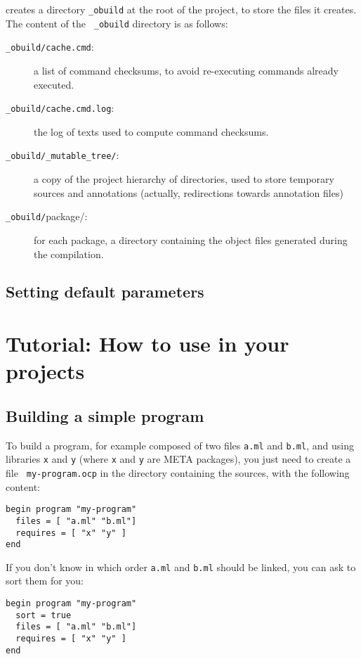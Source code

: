 \ocpbuild{} creates a directory {\tt \_obuild} at the root of the
project, to store the files it creates. The content of the {\tt
  \_obuild} directory is as follows:
\begin{description}
\item[{\tt \_obuild/cache.cmd}:] a list of command checksums, to avoid
  re-executing commands already executed.
\item[{\tt \_obuild/cache.cmd.log}:] the log of texts used to compute
  command checksums.
\item[{\tt \_obuild/\_mutable\_tree/}:] a copy of the project hierarchy
  of directories, used to store temporary sources and annotations
  (actually, redirections towards annotation files)
\item[{\tt \_obuild/}package/:] for each package, a directory
  containing the object files generated during the compilation.
\end{description}


\section{Setting \ocpbuild{} default parameters}

\chapter{Tutorial: How to use \ocpbuild{} in your projects}

\section{Building a simple program}

To build a program, for example composed of two files {\tt a.ml} and
{\tt b.ml}, and using libraries {\tt x} and {\tt y} (where {\tt x} and
{\tt y} are META packages), you just need to create a file {\tt
  my-program.ocp} in the directory containing the sources, with the
following content:

\begin{verbatim}
begin program "my-program"
  files = [ "a.ml" "b.ml"]
  requires = [ "x" "y" ]
end
\end{verbatim}

If you don't know in which order {\tt a.ml} and {\tt b.ml} should be
linked, you can ask \ocpbuild{} to sort them for you:

\begin{verbatim}
begin program "my-program"
  sort = true
  files = [ "a.ml" "b.ml"]
  requires = [ "x" "y" ]
end
\end{verbatim}

